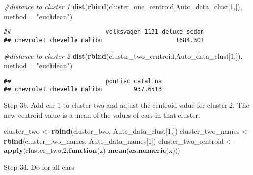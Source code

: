 \documentclass[11pt,]{article}
\newenvironment{Shaded}{\begin{snugshade}}{\end{snugshade}}
\newcommand{\CommentTok}[1]{\textcolor[rgb]{0.56,0.35,0.01}{\textit{#1}}}
\newcommand{\ControlFlowTok}[1]{\textcolor[rgb]{0.13,0.29,0.53}{\textbf{#1}}}
\newcommand{\DataTypeTok}[1]{\textcolor[rgb]{0.13,0.29,0.53}{#1}}
\newcommand{\DecValTok}[1]{\textcolor[rgb]{0.00,0.00,0.81}{#1}}
\newcommand{\KeywordTok}[1]{\textcolor[rgb]{0.13,0.29,0.53}{\textbf{#1}}}
\newcommand{\NormalTok}[1]{#1}
\newcommand{\StringTok}[1]{\textcolor[rgb]{0.31,0.60,0.02}{#1}}
\begin{document}
\begin{Shaded}
\begin{Highlighting}[]
\CommentTok{#distance to cluster 1}
\KeywordTok{dist}\NormalTok{(}\KeywordTok{rbind}\NormalTok{(cluster_one_centroid,Auto_data_clust[}\DecValTok{1}\NormalTok{,]), }\DataTypeTok{method =} \StringTok{"euclidean"}\NormalTok{) }
\end{Highlighting}
\end{Shaded}

\begin{verbatim}
##                           volkswagen 1131 deluxe sedan
## chevrolet chevelle malibu                     1684.301
\end{verbatim}

\begin{Shaded}
\begin{Highlighting}[]
\CommentTok{#distance to cluster 2}
\KeywordTok{dist}\NormalTok{(}\KeywordTok{rbind}\NormalTok{(cluster_two_centroid,Auto_data_clust[}\DecValTok{1}\NormalTok{,]), }\DataTypeTok{method =} \StringTok{"euclidean"}\NormalTok{)}
\end{Highlighting}
\end{Shaded}

\begin{verbatim}
##                           pontiac catalina
## chevrolet chevelle malibu         937.6513
\end{verbatim}

Step 3b. Add car 1 to cluster two and adjust the centroid value for
cluster 2. The new centroid value is a mean of the values of cars in
that cluster.

\begin{Shaded}
\begin{Highlighting}[]
\NormalTok{cluster_two <-}\StringTok{ }\KeywordTok{rbind}\NormalTok{(cluster_two, Auto_data_clust[}\DecValTok{1}\NormalTok{,])}
\NormalTok{cluster_two_names <-}\StringTok{ }\KeywordTok{rbind}\NormalTok{(cluster_two_names, Auto_data_names[}\DecValTok{1}\NormalTok{])}
\NormalTok{cluster_two_centroid <-}\StringTok{ }\KeywordTok{apply}\NormalTok{(cluster_two,}\DecValTok{2}\NormalTok{,}\ControlFlowTok{function}\NormalTok{(x) }\KeywordTok{mean}\NormalTok{(}\KeywordTok{as.numeric}\NormalTok{(x)))}
\end{Highlighting}
\end{Shaded}

Step 3d. Do for all cars
\end{document}
